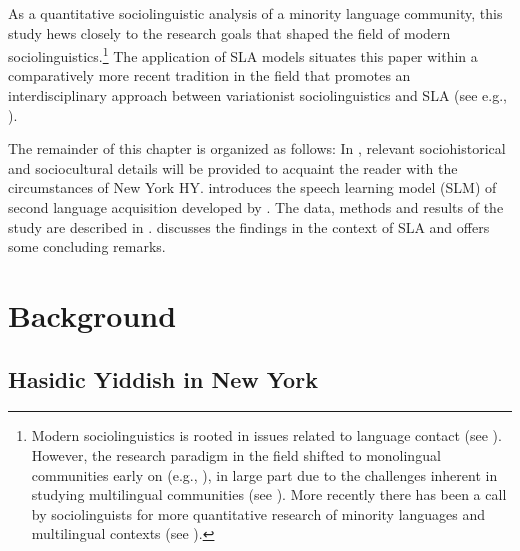 \documentclass[output=paper]{langsci/langscibook}
\begin{document}
As a quantitative sociolinguistic analysis of a minority language community, this study hews closely to the research goals that shaped the field of modern sociolinguistics.\footnote{Modern sociolinguistics is rooted in issues related to language contact (see \citealt{Weinreich1970}). However, the research paradigm in the field shifted to monolingual communities early on (e.g., \citealt{labov_social_2006}), in large part due to the challenges inherent in studying multilingual communities (see \citealt{Sankoff2002}). More recently there has been a call by sociolinguists for more quantitative research of minority languages and multilingual contexts (see \citealt{GuyAdli2019, NagyMeyerhoff2008, Stanford2016}).} The application of SLA models situates this paper within a comparatively more recent tradition in the field that promotes an interdisciplinary approach between variationist sociolinguistics and SLA (see e.g., \citealt{AdamsonRegan1991, Bayley2000, FasoldPreston2007, PrestonBayley1996, Regan2004, Tarone2007, YaoChang2016}). 

The remainder of this chapter is organized as follows: In , relevant sociohistorical and sociocultural details will be provided to acquaint the reader with the circumstances of New York HY.  introduces the speech learning model (SLM) of second language acquisition developed by \citet{Flege1995, Flege1996}. The data, methods and results of the study are described in .  discusses the findings in the context of SLA and offers some concluding remarks.  

\section{Background}
\label{sec:nove:2}


\subsection{Hasidic Yiddish in New York}
\label{sec:nove:2.1}
\end{document}
